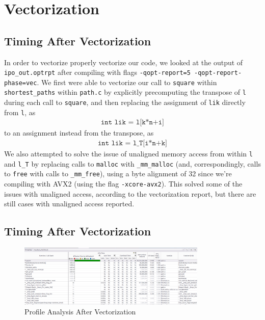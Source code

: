 \section{Vectorization}\label{sec:vector}

\subsection{Timing After Vectorization}
In order to vectorize properly vectorize our code, we looked at the output of \texttt{ipo\_out.optrpt} after compiling with flags \texttt{-qopt-report=5 -qopt-report-phase=vec}. We first were able to vectorize our call to \texttt{square} within \texttt{shortest\_paths} within \texttt{path.c} by explicitly precomputing the transpose of \texttt{l} during each call to \texttt{square}, and then replacing the assignment of \texttt{lik} directly from \texttt{l}, as
\begin{gather*}
\texttt{int lik = l[k*n+i]}
\end{gather*}
to an assignment instead from the transpose, as
\begin{gather*}
\texttt{int lik = l\_T[i*n+k]}
\end{gather*}
We also attempted to solve the issue of unaligned memory access from within \texttt{l} and \texttt{l\_T} by replacing calls to \texttt{malloc} with \texttt{\_mm\_malloc} (and, correspondingly, calls to \texttt{free} with calls to \texttt{\_mm\_free}), using a byte alignment of 32 since we're compiling with AVX2 (using the flag \texttt{-xcore-avx2}). This solved some of the issues with unaligned access, according to the vectorization report, but there are still cases with unaligned access reported.

\subsection{Timing After Vectorization}

\begin{figure}[H]
    \centering
    \includegraphics[width=0.8\textwidth]{figs/1_analysis.png}
    \caption{Profile Analysis After Vectorization}
    \label{vectorized_profile_result_0}
\end{figure}

